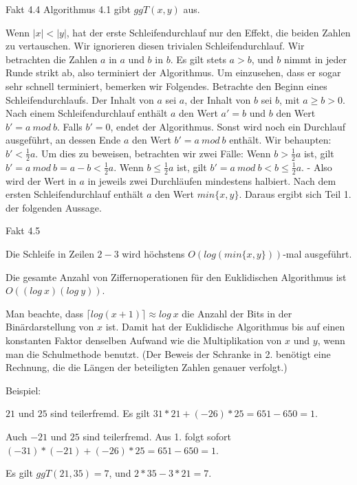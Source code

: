 \documentclass[a4paper]{article}
\begin{document}
\begin{multicols}{3}
    Fakt 4.4 Algorithmus 4.1 gibt $ggT(x,y)$ aus.

    Wenn $|x|<|y|$, hat der erste Schleifendurchlauf nur den Effekt, die beiden Zahlen zu vertauschen. Wir ignorieren diesen trivialen Schleifendurchlauf. Wir betrachten die Zahlen $a$ in $a$ und $b$ in $b$. Es gilt stets $a>b$, und $b$ nimmt in jeder Runde strikt ab, also terminiert der Algorithmus. Um einzusehen, dass er sogar sehr schnell terminiert, bemerken wir Folgendes. Betrachte den Beginn eines Schleifendurchlaufs. Der Inhalt von $a$ sei $a$, der Inhalt von $b$ sei $b$, mit $a\geq b >0$. Nach einem Schleifendurchlauf enthält $a$ den Wert $a'=b$ und $b$ den Wert $b'=a\ mod\ b$. Falls $b'=0$, endet der Algorithmus. Sonst wird noch ein Durchlauf ausgeführt, an dessen Ende $a$ den Wert $b'=a\ mod\ b$ enthält. Wir behaupten: $b'<\frac{1}{2} a$. Um dies zu beweisen, betrachten wir zwei Fälle: Wenn $b>\frac{1}{2} a$ ist, gilt $b'=a\ mod\ b=a-b<\frac{1}{2} a$. Wenn $b\leq\frac{1}{2} a$ ist, gilt $b'=a\ mod\ b < b\leq\frac{1}{2} a$. - Also wird der Wert in $a$ in jeweils zwei Durchläufen mindestens halbiert. Nach dem ersten Schleifendurchlauf enthält $a$ den Wert $min\{x,y\}$. Daraus ergibt sich Teil 1. der folgenden Aussage.

    Fakt 4.5
    \begin{enumerate*}
        \item Die Schleife in Zeilen $2-3$ wird höchstens $O(log(min\{x,y\}))$-mal ausgeführt.
        \item Die gesamte Anzahl von Ziffernoperationen für den Euklidischen Algorithmus ist $O((log\ x)(log\ y))$.
    \end{enumerate*}

    Man beachte, dass $\lceil log(x+1)\rceil\approx log\ x$ die Anzahl der Bits in der Binärdarstellung von $x$ ist. Damit hat der Euklidische Algorithmus bis auf einen konstanten Faktor denselben Aufwand wie die Multiplikation von $x$ und $y$, wenn man die Schulmethode benutzt. (Der Beweis der Schranke in 2. benötigt eine Rechnung, die die Längen der beteiligten Zahlen genauer verfolgt.)

    Beispiel:
    \begin{enumerate*}
        \item $21$ und $25$ sind teilerfremd. Es gilt $31*21 + (-26)*25 = 651-650 = 1$.
        \item Auch $-21$ und $25$ sind teilerfremd. Aus 1. folgt sofort $(-31)*(-21) + (-26)*25 =651 -650 = 1$.
        \item Es gilt $ggT(21,35) = 7$, und $2* 35 - 3 *21 = 7$.
    \end{enumerate*}


\end{multicols}
\end{document}
